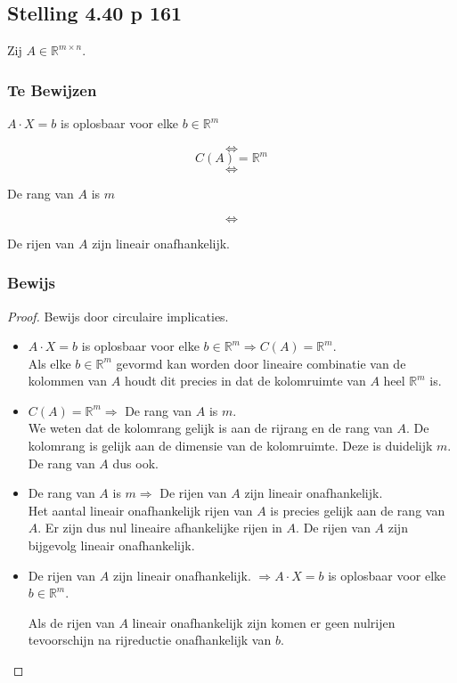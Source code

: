 \documentclass[lineaire_algebra_oplossingen.tex]{subfiles}
\begin{document}
\subsection{Stelling 4.40 p 161}
Zij $A \in \mathbb{R}^{m\times n}$.
\subsubsection*{Te Bewijzen}
\begin{center}
$A\cdot X = b$ is oplosbaar voor elke $b\in \mathbb{R}^m$
\end{center}
\[\Leftrightarrow\]
\[C(A) = \mathbb{R}^m\]
\[\Leftrightarrow\]
\begin{center}
De rang van $A$ is $m$
\end{center}
\[\Leftrightarrow\]
\begin{center}
De rijen van $A$ zijn lineair onafhankelijk.
\end{center}
\subsubsection*{Bewijs}
\begin{proof}
Bewijs door circulaire implicaties.
\begin{itemize}
\item
$A\cdot X = b$ is oplosbaar voor elke $b\in \mathbb{R}^m \Rightarrow C(A) = \mathbb{R}^m$.\\
Als elke $b\in \mathbb{R}^m$ gevormd kan worden door lineaire combinatie van de kolommen van $A$ houdt dit precies in dat de kolomruimte van $A$ heel $\mathbb{R}^m$ is.
\item
$C(A) = \mathbb{R}^m \Rightarrow $ De rang van $A$ is $m$.\\
We weten dat de kolomrang gelijk is aan de rijrang en de rang van $A$. De kolomrang is gelijk aan de dimensie van de kolomruimte. Deze is duidelijk $m$. De rang van $A$ dus ook.

\item
 De rang van $A$ is $m \Rightarrow$ De rijen van $A$ zijn lineair onafhankelijk.\\
Het aantal lineair onafhankelijk rijen van $A$ is precies gelijk aan de rang van $A$. Er zijn dus nul lineaire afhankelijke rijen in $A$. De rijen van $A$ zijn bijgevolg lineair onafhankelijk.

\item
De rijen van $A$ zijn lineair onafhankelijk. $\Rightarrow A\cdot X = b$ is oplosbaar voor elke $b\in \mathbb{R}^m$.

Als de rijen van $A$ lineair onafhankelijk zijn komen er geen nulrijen tevoorschijn na rijreductie onafhankelijk van $b$.
\end{itemize}
\end{proof}
\end{document}
